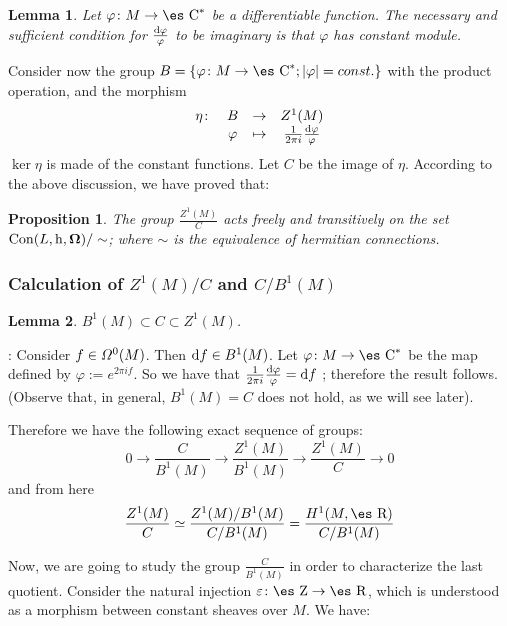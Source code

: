 \documentclass[12pt]{article}
\theoremstyle{plain}
\newtheorem{prop}{Proposition}
\newtheorem{lem}{Lemma}
\def\dst{\(}
\def\qed{\ifvmode\removelastskip\fi
{\unskip\nobreak\hfil\penalty50\hbox{}\nobreak\hfil
\hbox{\vrule height1.2ex width1.2ex}\parfillskip=0pt
\finalhyphendemerits=0 \par\smallskip}}
\def\d{{\rm d}}
\def\h{{\rm h}}
\def\curv{{\bf \Omega}}
\def\Zahl{\mbox{\es Z}}
\def\Real{\mbox{\es R}}
\def\Complex{\mbox{\es C}}
\begin{document}
\begin{lem}
Let $\varphi \colon M \to \Complex^*$ be a differentiable
function. The necessary and sufficient condition for \dst \frac{\d
\varphi}{\varphi}\) to be imaginary is that $\varphi$ has constant
module.
\end{lem}

Consider now the group
$B = \{ \varphi \colon M \to \Complex^* ; |\varphi | = const. \}$
with the product operation, and the morphism
$$
\begin{array}{cccc}
\eta \colon & B & \rightarrow & Z^1(M)
\\
& \varphi & \mapsto & \frac{1}{2\pi i}\frac{\d \varphi}{\varphi}
\end{array}
$$
$\ker \eta$ is made of the constant functions.
Let $C$ be the image of $\eta$.
According to the above discussion,
we have proved that:

\begin{prop}
The group \dst \frac{Z^1(M)}{C}\)
acts freely and transitively on the set
${\rm Con}(L,\h ,\curv )/ \sim$;
where $\sim$ is the equivalence of hermitian connections.
\end{prop}



\subsubsection{Calculation of $Z^1(M)/C$ and $C/B^1(M)$}


\begin{lem}
$B^1(M) \subset C \subset Z^1(M)$.
\end{lem}
: 
Consider $f \in {\mit\Omega}^0(M)$. Then $\d f \in B^1(M)$.
Let $\varphi \colon M \to \Complex^*$ be the map
defined by $\varphi := e^{2\pi if}$.
So we have that
\dst\frac{1}{2\pi i} \frac{\d \varphi}{\varphi} = \d f\) ;
therefore the result follows.
(Observe that, in general,
$B^1(M) =C$ does not hold, as we will see later).
\qed

Therefore we have the following exact sequence of groups:
$$
0 \to \frac{C}{B^1(M)} \to \frac{Z^1(M)}{B^1(M)}
\to \frac{Z^1(M)}{C} \to 0
$$
and from here
$$
\frac{Z^1(M)}{C} \simeq \frac{Z^1(M)/B^1(M)}{C/B^1(M)}
= \frac{H^1(M,\Real )}{C /B^1(M)}
$$

Now, we are going to study the group $\frac{C}{B^1(M)}$
in order to characterize the last quotient.
Consider the natural injection $\varepsilon \colon \Zahl \to \Real$,
which is
understood as a morphism between constant sheaves over $M$. We have:
\end{document}
